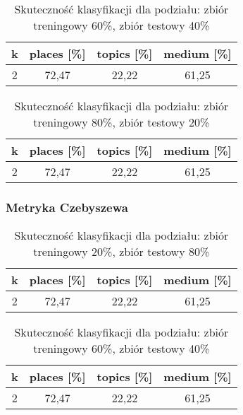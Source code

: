 \documentclass{classrep}
\begin{document}
\begin{table}[H]
	\centering
	\begin{tabular}{c c c c} 
		\hline
		\textbf{k} & \textbf{places [\%]} & \textbf{topics [\%]} &  \textbf{medium [\%]} \\ [0.5ex] 
		\hline
		\hline 
			2 & 72,47 & 22,22 & 61,25 \\ 
		\hline
	\end{tabular}
	\caption{Skuteczność klasyfikacji dla podziału: zbiór treningowy 60\%, zbiór testowy 40\%}
\end{table}

\begin{table}[H]
	\centering
	\begin{tabular}{c c c c} 
		\hline
		\textbf{k} & \textbf{places [\%]} & \textbf{topics [\%]} &  \textbf{medium [\%]} \\ [0.5ex] 
		\hline
		\hline 
			2 & 72,47 & 22,22 & 61,25 \\ 
		\hline
	\end{tabular}
	\caption{Skuteczność klasyfikacji dla podziału: zbiór treningowy 80\%, zbiór testowy 20\%}
\end{table}

\subsubsection{Metryka Czebyszewa}
\begin{table}[H]
	\centering
	\begin{tabular}{c c c c} 
		\hline
		\textbf{k} & \textbf{places [\%]} & \textbf{topics [\%]} &  \textbf{medium [\%]} \\ [0.5ex] 
		\hline
		\hline 
			2 & 72,47 & 22,22 & 61,25 \\ 
		\hline
	\end{tabular}
	\caption{Skuteczność klasyfikacji dla podziału: zbiór treningowy 20\%, zbiór testowy 80\%}
\end{table}

\begin{table}[H]
	\centering
	\begin{tabular}{c c c c} 
		\hline
		\textbf{k} & \textbf{places [\%]} & \textbf{topics [\%]} &  \textbf{medium [\%]} \\ [0.5ex] 
		\hline
		\hline 
			2 & 72,47 & 22,22 & 61,25 \\ 
		\hline
	\end{tabular}
	\caption{Skuteczność klasyfikacji dla podziału: zbiór treningowy 60\%, zbiór testowy 40\%}
\end{table}
\end{document}
